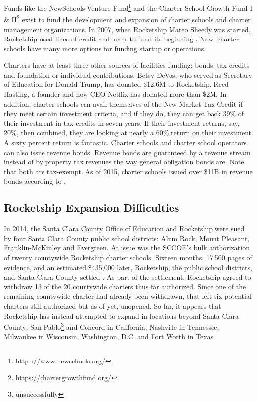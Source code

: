 Funds like the NewSchools Venture Fund\footnote{\url{https://www.newschools.org/}} and the Charter School Growth Fund I \& II\footnote{\url{https://chartergrowthfund.org/}} exist to fund the development and expansion of charter schools and charter management organizations. In 2007, when Rocketship Mateo Sheedy was started, Rocketship used lines of credit and loans to fund its beginning \parencite[260]{Danner2006}. Now, charter schools have many more options for funding startup or operations.

Charters have at least three other sources of facilities funding: bonds, tax credits and foundation or individual contributions. Betsy DeVos, who served as Secretary of Education for Donald Trump, has donated \$12.6M to Rocketship. Reed Hasting, a founder and now CEO Netflix has donated more than \$2M. In addition, charter schools can avail themselves of the New Market Tax Credit if they meet certain investment criteria, and if they do, they can get back 39\% of their investment  in tax credits in seven years. If their investment returns, say, 20\%, then combined, they are looking at nearly a 60\% return on their investment. A sixty percent return is fantastic. Charter schools and charter school operators can also issue revenue bonds. Revenue bonds are guaranteed by a revenue stream instead of by property tax revenues the way general obligation bonds are. Note that both are tax-exempt. As of 2015, charter schools issued over \$11B in revenue bonds according to \textcite{Clark-Herrera.etal2019}.

\subsection{Rocketship Expansion Difficulties}\label{sec:rocketship-expansion-difficulties}\indent

In 2014, the Santa Clara County Office of Education and Rocketship were sued by four Santa Clara County public school districts: Alum Rock, Mount Pleasant, Franklin-McKinley and Evergreen. At issue was the SCCOE's bulk authorization of twenty countywide Rocketship charter schools. Sixteen months, 17,500 pages of evidence, and an estimated \$435,000 later, Rocketship, the public school districts, and Santa Clara County settled \parencite{Noguchi2015}. As part of the settlement, Rocketship agreed to withdraw 13 of the 20 countywide charters thus far authorized. Since one of the remaining countywide charter had already been withdrawn, that left six potential charters still authorized but as of yet, unopened. So far, it appears that Rocketship has instead attempted to expand in locations beyond Santa Clara County: San Pablo\footnote{unsuccessfully} and Concord in California, Nashville in Tennessee, Milwaukee in Wisconsin, Washington, D.C. and Fort Worth in Texas.

